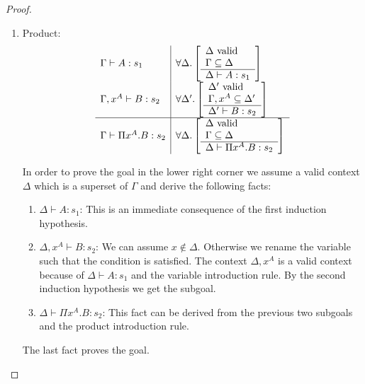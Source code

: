 \begin{theorem}
\begin{proof}
\begin{enumerate}
        \item Product:
            $$
            \begin{array}{l|l}
            \Gamma \vdash A : s_1
            &
            \forall \Delta
                . \left[\begin{array}{l} 
                    \Delta \text{ valid}
                    \\
                    \Gamma \subseteq \Delta
                 \\ \hline 
                    \Delta \vdash A: s_1
                \end{array}\right]
            \\
            \Gamma,x^A \vdash B: s_2
            &
            \forall \Delta'
                . \left[\begin{array}{l} 
                    \Delta' \text{ valid}
                    \\
                    \Gamma,x^A \subseteq \Delta'
                 \\ \hline 
                    \Delta' \vdash B: s_2
                \end{array}\right]
            \\
            \hline
            \Gamma \vdash \Pi x^A. B: s_2
            &
            \forall \Delta
                . \left[\begin{array}{l} 
                    \Delta \text{ valid}
                    \\
                    \Gamma \subseteq \Delta
                 \\ \hline 
                    \Delta \vdash \Pi x^A. B: s_2
                \end{array}\right]
            \end{array}
            $$


            In order to prove the goal in the lower right corner we assume a
            valid context $\Delta$ which is a superset of $\Gamma$ and derive
            the following facts:
            \begin{enumerate}
            \item $\Delta \vdash A: s_1$: This is an immediate consequence of
                the first induction hypothesis.

            \item $\Delta,x^A \vdash B : s_2$: We can assume $x \notin \Delta$.
                Otherwise we rename the variable such that the condition is
                    satisfied. The context $\Delta,x^A$ is a valid context
                    because of $\Delta\vdash A: s_1$ and the variable
                    introduction rule. By the second induction hypothesis we get
                    the subgoal.

            \item $\Delta\vdash \Pi x^A. B: s_2$: This fact can be derived from
                the previous two subgoals and the product introduction rule.
            \end{enumerate}
            The last fact proves the goal.


\end{enumerate}
\end{proof}
\end{theorem}

